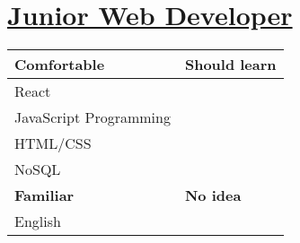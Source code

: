 \documentclass[11pt]{article}
\begin{document}
\section{\href{https://www.indeed.com/rc/clk?jk=0bda2a0e627c8c9a\&fccid=0c213b537d8bfffd\&vjs=3}{Junior Web Developer}}
\label{sec:orgd81c540}
\begin{center}
\begin{tabular}{|l|l|}
\hline
\textbf{Comfortable} & \textbf{Should learn}\\
\hline
React & \\
JavaScript Programming & \\
HTML/CSS & \\
NoSQL & \\
\hline
\textbf{Familiar} & \textbf{No idea}\\
\hline
English & \\
\hline
\end{tabular}
\end{center}
\end{document}
